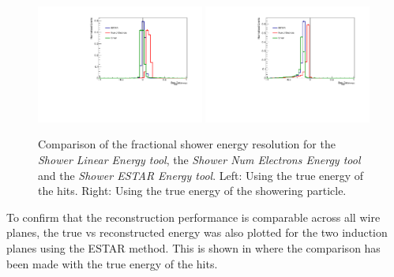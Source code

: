 \begin{figure}[h!]
    \centering
    \includegraphics[width = 0.49\textwidth]{figures-chap4/bias_cheat_plane_2_all.pdf}
    \includegraphics[width = 0.49\textwidth]{figures-chap4/bias_cheat_plane_2_all_showeringE.pdf}
    \caption[Comparison of the fractional shower energy resolution.]{Comparison of the fractional shower energy resolution for the \textit{Shower Linear Energy tool}, the \textit{Shower Num Electrons Energy tool} and the \textit{Shower ESTAR Energy tool}. Left: Using the true energy of the hits. Right: Using the true energy of the showering particle.}
    \label{fig:fractional_energy_resolution}
\end{figure}

\newpage
To confirm that the reconstruction performance is comparable across all wire planes, the true vs reconstructed energy was also plotted for the two induction planes using the ESTAR method. This is shown in  where the comparison has been made with the true energy of the hits.

